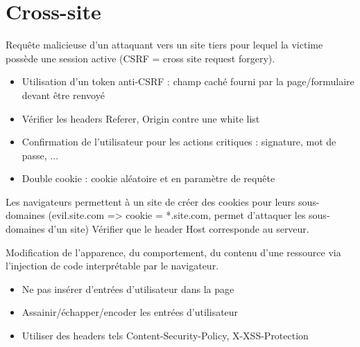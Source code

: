 \documentclass[a4paper]{article}
\begin{document}
\section{Cross-site}





\begin{attaque}[CSRF]
    Requête malicieuse d’un attaquant vers un site tiers pour lequel la victime possède une session active (CSRF = cross site request forgery).
    \begin{itemize}
        \item Utilisation d’un token anti-CSRF : champ caché fourni par la page/formulaire devant être renvoyé
        \item Vérifier les headers Referer, Origin contre une white list
        \item Confirmation de l’utilisateur pour les actions critiques : signature, mot de passe, ...
        \item Double cookie : cookie aléatoire et en paramètre de requête
    \end{itemize}
\end{attaque}

\begin{attaque}
    Les navigateurs permettent à un site de créer des cookies pour leurs sous-domaines (evil.site.com => cookie = *.site.com, permet d'attaquer les sous-domaines d'un site)
    Vérifier que le header Host corresponde au serveur.
\end{attaque}

\begin{attaque}
    Modification de l’apparence, du comportement, du contenu d’une
    ressource via l’injection de code interprétable par le navigateur.
    \begin{itemize}
        \item Ne pas insérer d’entrées d’utilisateur dans la page
        \item Assainir/échapper/encoder les entrées d’utilisateur
        \item Utiliser des headers tels Content-Security-Policy, X-XSS-Protection
    \end{itemize}
\end{attaque}
\end{document}
